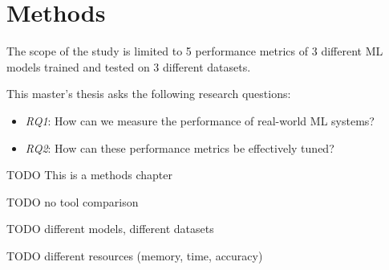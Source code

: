 \chapter{Methods}


The scope of the study is limited to 5 performance metrics of 3 different ML models trained and tested on 3 different datasets.

This master's thesis asks the following research questions:
\begin{itemize}
    \item \emph{RQ1}: How can we measure the performance of real-world ML systems?
    \item \emph{RQ2}: How can these performance metrics be effectively tuned?
\end{itemize}
TODO This is a methods chapter

TODO no tool comparison

TODO different models, different datasets

TODO different resources (memory, time, accuracy)